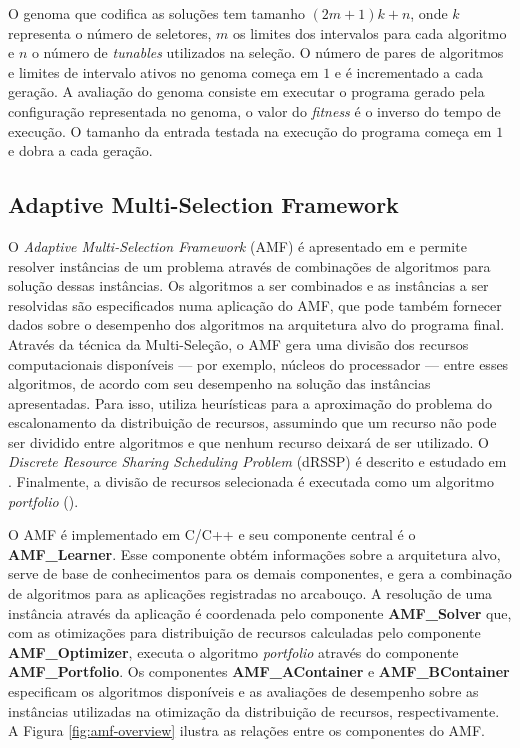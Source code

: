 \documentclass[a4paper, 12pt]{article}
\begin{document}
O genoma que codifica as soluções tem tamanho $(2m + 1)k + n$,
onde $k$ representa o número de seletores, $m$ os
limites dos intervalos para cada algoritmo e $n$ o número de \emph{tunables}
utilizados na seleção. O número de pares de algoritmos e limites de intervalo
ativos no genoma começa em $1$ e é incrementado a cada geração.
A avaliação do genoma consiste em executar o programa gerado pela
configuração representada no genoma, o valor do \emph{fitness} é o inverso
do tempo de execução. O tamanho da entrada testada na execução do programa
começa em $1$ e dobra a cada geração.

\subsection{Adaptive Multi-Selection Framework} \label{sec:amf}

O \emph{Adaptive Multi-Selection Framework} (AMF) é apresentado em
\citet{goldman2012framework} e permite resolver instâncias de um problema
através de combinações de algoritmos para solução dessas instâncias.
Os algoritmos a ser combinados e as instâncias a ser resolvidas são
especificados numa aplicação do AMF, que pode também fornecer dados sobre
o desempenho dos algoritmos na arquitetura alvo do programa final.
Através da técnica da Multi-Seleção, o AMF gera uma divisão dos recursos
computacionais disponíveis --- por exemplo, núcleos do processador --- entre
esses algoritmos, de acordo com seu desempenho na solução das instâncias
apresentadas. Para isso, utiliza heurísticas para a aproximação do problema do
escalonamento da distribuição de recursos, assumindo que
um recurso não pode ser dividido entre algoritmos e que nenhum recurso
deixará de ser utilizado. O \emph{Discrete Resource Sharing Scheduling Problem}
(dRSSP) é descrito e estudado em
\citet{bougeret2009combining,bougeret2011approximating}. Finalmente,
a divisão de recursos selecionada é executada como um algoritmo
\emph{portfolio} (\citet{huberman1997economics}).

O AMF é implementado em C/C++ e seu componente central é o
\textbf{AMF\_Learner}. Esse componente obtém informações sobre a arquitetura
alvo, serve de base de conhecimentos para os demais componentes,
e gera a combinação de algoritmos para as aplicações registradas no
arcabouço. A resolução de uma instância através da aplicação é coordenada pelo
componente \textbf{AMF\_Solver} que, com as otimizações para distribuição de
recursos calculadas pelo componente \textbf{AMF\_Optimizer}, executa o
algoritmo \emph{portfolio} através do componente \textbf{AMF\_Portfolio}.
Os componentes \textbf{AMF\_AContainer} e \textbf{AMF\_BContainer} especificam
os algoritmos disponíveis e as avaliações de desempenho sobre as instâncias
utilizadas na otimização da distribuição de recursos, respectivamente. A Figura
\ref{fig:amf-overview} ilustra as relações entre os componentes do AMF.
\end{document}
